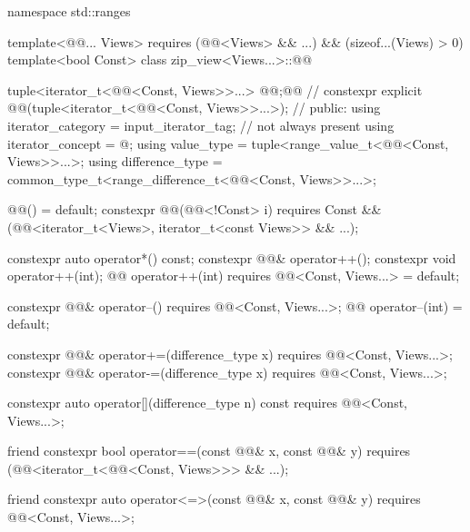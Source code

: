 %
\begin{codeblock}
namespace std::ranges {
  template<@@... Views>
    requires (@@<Views> && ...) && (sizeof...(Views) > 0)
  template<bool Const>
  class zip_view<Views...>::@@ {
    tuple<iterator_t<@@<Const, Views>>...> @@;@\itcorr[-1]@       // \expos
    constexpr explicit @@(tuple<iterator_t<@@<Const, Views>>...>);
                                                                            // \expos
  public:
    using iterator_category = input_iterator_tag;                           // not always present
    using iterator_concept  = @\seebelow@;
    using value_type = tuple<range_value_t<@@<Const, Views>>...>;
    using difference_type = common_type_t<range_difference_t<@@<Const, Views>>...>;

    @@() = default;
    constexpr @@(@@<!Const> i)
      requires Const && (@@<iterator_t<Views>, iterator_t<const Views>> && ...);

    constexpr auto operator*() const;
    constexpr @@& operator++();
    constexpr void operator++(int);
    @@ operator++(int) requires @@<Const, Views...> = default;

    constexpr @@& operator--() requires @@<Const, Views...>;
    @@ operator--(int) = default;

    constexpr @@& operator+=(difference_type x)
      requires @@<Const, Views...>;
    constexpr @@& operator-=(difference_type x)
      requires @@<Const, Views...>;

    constexpr auto operator[](difference_type n) const
      requires @@<Const, Views...>;

    friend constexpr bool operator==(const @@& x, const @@& y)
      requires (@@<iterator_t<@@<Const, Views>>> && ...);

    friend constexpr auto operator<=>(const @@& x, const @@& y)
      requires @@<Const, Views...>;

}}
\end{codeblock}
